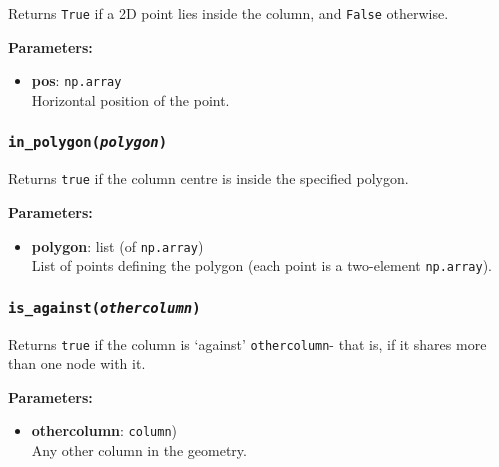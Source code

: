 Returns \texttt{True} if a 2D point lies inside the column, and \texttt{False} otherwise.

\textbf{Parameters:}
\begin{itemize}
\item \textbf{pos}: \texttt{np.array}\\
  Horizontal position of the point.
\end{itemize}

\subsubsection{\texttt{in\_polygon(\emph{polygon})}}

Returns \texttt{true} if the column centre is inside the specified polygon.

\textbf{Parameters:}
\begin{itemize}
\item \textbf{polygon}: list (of \texttt{np.array})\\
  List of points defining the polygon (each point is a two-element \texttt{np.array}).
\end{itemize}

\subsubsection{\texttt{is\_against(\emph{othercolumn})}}

Returns \texttt{true} if the column is `against' \texttt{othercolumn}- that is, if it shares more than one node with it.

\textbf{Parameters:}
\begin{itemize}
\item \textbf{othercolumn}: \texttt{column})\\
  Any other column in the geometry.
\end{itemize}

